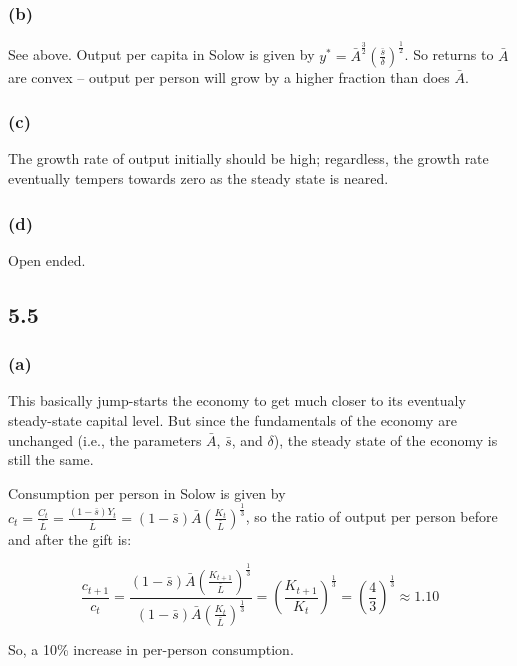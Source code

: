 \documentclass{article}
\begin{document}
\subsubsection*{(b)}

See above. Output per capita in Solow is given by $y^{*} = \bar{A}^{\frac32} \left( \frac{\bar{s}}{\delta} \right)^{\frac12}$. So returns to $\bar{A}$ are convex -- output per person will grow by a higher fraction than does $\bar{A}$.

\subsubsection*{(c)}

The growth rate of output initially should be high; regardless, the growth rate eventually tempers towards zero as the steady state is neared.

\subsubsection*{(d)}

Open ended.

\subsection*{5.5}

\subsubsection*{(a)}

This basically jump-starts the economy to get much closer to its eventualy steady-state capital level. But since the fundamentals of the economy are unchanged (i.e., the parameters $\bar{A}$, $\bar{s}$, and $\delta$), the steady state of the economy is still the same.

Consumption per person in Solow is given by $c_t = \frac{C_t}{\bar{L}} = \frac{\left(1-\bar{s}\right) Y_t}{\bar{L}} = \left(1-\bar{s}\right) \bar{A} \left( \frac{K_t}{\bar{L}} \right)^{\frac13}$, so the ratio of output per person before and after the gift is:

\[ \frac{c_{t+1}}{c_t} = \frac{\left(1-\bar{s}\right) \bar{A} \left( \frac{K_{t+1}}{\bar{L}} \right)^{\frac13}}{\left(1-\bar{s}\right) \bar{A} \left( \frac{K_t}{\bar{L}} \right)^{\frac13}} = \left( \frac{K_{t+1}}{K_t} \right)^{\frac13} = \left( \frac43 \right)^{\frac13} \approx 1.10 \]

So, a 10\% increase in per-person consumption.
\end{document}
